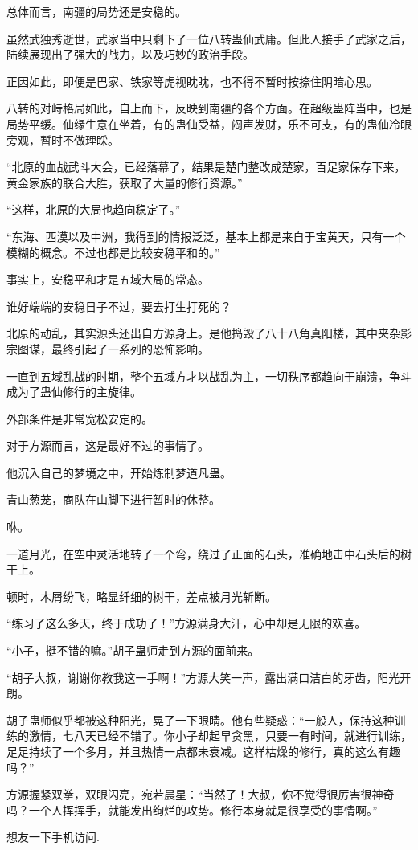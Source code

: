 \begin{this_body}
总体而言，南疆的局势还是安稳的。

虽然武独秀逝世，武家当中只剩下了一位八转蛊仙武庸。但此人接手了武家之后，陆续展现出了强大的战力，以及巧妙的政治手段。

正因如此，即便是巴家、铁家等虎视眈眈，也不得不暂时按捺住阴暗心思。

八转的对峙格局如此，自上而下，反映到南疆的各个方面。在超级蛊阵当中，也是局势平缓。仙缘生意在坐着，有的蛊仙受益，闷声发财，乐不可支，有的蛊仙冷眼旁观，暂时不做理睬。

“北原的血战武斗大会，已经落幕了，结果是楚门整改成楚家，百足家保存下来，黄金家族的联合大胜，获取了大量的修行资源。”

“这样，北原的大局也趋向稳定了。”

“东海、西漠以及中洲，我得到的情报泛泛，基本上都是来自于宝黄天，只有一个模糊的概念。不过也都是比较安稳平和的。”

事实上，安稳平和才是五域大局的常态。

谁好端端的安稳日子不过，要去打生打死的？

北原的动乱，其实源头还出自方源身上。是他捣毁了八十八角真阳楼，其中夹杂影宗图谋，最终引起了一系列的恐怖影响。

一直到五域乱战的时期，整个五域方才以战乱为主，一切秩序都趋向于崩溃，争斗成为了蛊仙修行的主旋律。

外部条件是非常宽松安定的。

对于方源而言，这是最好不过的事情了。

他沉入自己的梦境之中，开始炼制梦道凡蛊。

青山葱茏，商队在山脚下进行暂时的休整。

咻。

一道月光，在空中灵活地转了一个弯，绕过了正面的石头，准确地击中石头后的树干上。

顿时，木屑纷飞，略显纤细的树干，差点被月光斩断。

“练习了这么多天，终于成功了！”方源满身大汗，心中却是无限的欢喜。

“小子，挺不错的嘛。”胡子蛊师走到方源的面前来。

“胡子大叔，谢谢你教我这一手啊！”方源大笑一声，露出满口洁白的牙齿，阳光开朗。

胡子蛊师似乎都被这种阳光，晃了一下眼睛。他有些疑惑：“一般人，保持这种训练的激情，七八天已经不错了。你小子却起早贪黑，只要一有时间，就进行训练，足足持续了一个多月，并且热情一点都未衰减。这样枯燥的修行，真的这么有趣吗？”

方源握紧双拳，双眼闪亮，宛若晨星：“当然了！大叔，你不觉得很厉害很神奇吗？一个人挥挥手，就能发出绚烂的攻势。修行本身就是很享受的事情啊。”

想友一下手机访问.

\end{this_body}

